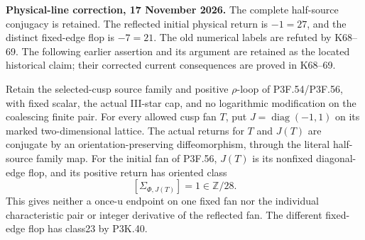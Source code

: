 \begin{theorem}\label{night:P3K.45}
\par\noindent\textbf{Physical-line correction, 17 November 2026.} The complete half-source conjugacy is retained. The reflected initial physical return is \(-1=27\), and the distinct fixed-edge flop is \(-7=21\). The old numerical labels are refuted by K68--69. The following earlier assertion and its argument are retained as the located historical claim; their corrected current consequences are proved in K68--69.\medskip\par 
Retain the selected-cusp source family and positive \(\rho\)-loop
of P3F.54/P3F.56, with fixed scalar, the actual III-star cap, and no
logarithmic modification on the coalescing finite pair. For every
allowed cusp fan \(T\), put \(J=\operatorname{diag}(-1,1)\)
on its marked two-dimensional lattice. The actual returns for
\(T\) and \(J(T)\) are conjugate by an orientation-preserving
diffeomorphism, through the literal half-source family map.
For the initial fan of P3F.56, \(J(T)\) is its nonfixed
diagonal-edge flop, and its positive return has oriented class
\[
                 [\Sigma_{\Phi,J(T)}]=1\in\mathbb Z/28.
\]
This gives neither a once-u endpoint on one fixed fan nor the
individual characteristic pair or integer derivative of the
reflected fan. The different fixed-edge flop has class23 by
P3K.40.
\end{theorem}
